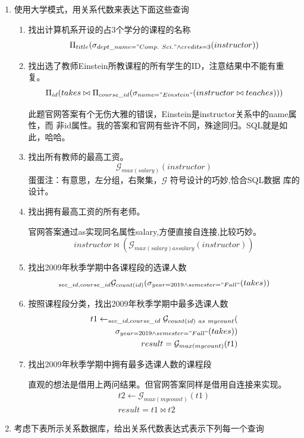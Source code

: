 \documentclass{dingjia}
\begin{document}
\begin{enumerate}
\item 使用大学模式，用关系代数来表达下面这些查询
  \begin{enumerate}
  \item 找出计算机系开设的占3个学分的课程的名称
    \[ \Pi_{title}(\sigma_{dept\_name = "Comp.\ Sci." \land credits = 3}(instructor))\]

  \item 找出选了教师Einstein所教课程的所有学生的ID，注意结果中不能有重复。
    \[\Pi_{id}(takes \bowtie \Pi_{course\_id}(\sigma_{name = "Einstein"}(instructor \bowtie teaches)))\]

    此题官网答案有个无伤大雅的错误，Einstein是instructor关系中的name属性，而
    非id属性。我的答案和官网有些许不同，殊途同归。SQL就是如此，哈哈。

  \item 找出所有教师的最高工资。
    \[\mathcal{G}_{max(salary)}(instructor)\]
    蛋蛋注：有意思，左分组，右聚集，$\mathcal{G}$ 符号设计的巧妙,恰合SQL数据
    库的设计。

  \item 找出拥有最高工资的所有老师。

    官网答案通过as实现同名属性salary,方便直接自连接,比较巧妙。
    \[instructor \bowtie (\mathcal{G}_{max(salary) as salary}(instructor))\]

  \item 找出2009年秋季学期中各课程段的选课人数
    \[_{sec\_id, course\_id}\mathcal{G}_{count(id)}(\sigma_{year = 2019 \land semester = "Fall"}(takes))\]

  \item 按照课程段分类，找出2009年秋季学期中最多选课人数
    \begin{align*}
      t1 \leftarrow  _{sec\_id,  course\_id}\mathcal{G}_{count(id)\ as\ mycount}( \\
      \sigma_{  year = 2019 \land semester = "Fall"}(takes)) \\
      result  = \mathcal{G}_{max(mycount)}(t1)
    \end{align*}

  \item 找出2009年秋季学期中拥有最多选课人数的课程段

    直观的想法是借用上两问结果。但官网答案同样是借用自连接来实现。
    \begin{gather*}
      t2 \leftarrow \mathcal{G}_{max(mycount)}(t1)\\
      result = t1 \bowtie t2
    \end{gather*}
  \end{enumerate}
\item 考虑下表所示关系数据库，给出关系代数表达式表示下列每一个查询


\end{enumerate}
\end{document}

